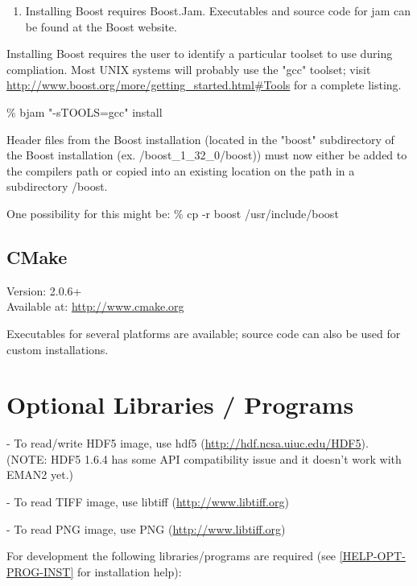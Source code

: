   \begin{enumerate}
    \item
      Installing Boost requires Boost.Jam.  Executables and
      source code for jam can be found at the Boost website.
  \end {enumerate}

  Installing Boost requires the user to identify a particular
  toolset to use during compliation.  Most UNIX systems will
  probably use the "gcc" toolset; visit
  \href{http://www.boost.org/more/getting\_started.html\#Tools}{http://www.boost.org/more/getting\_started.html\#Tools}
  for a complete listing.        

  \% bjam "-sTOOLS=gcc" install

  Header files from the Boost installation (located in the
  "boost" subdirectory of the Boost installation
  (ex. /boost\_1\_32\_0/boost)) must now either be added to the
  compilers path or copied into an existing location on the path
  in a subdirectory /boost.

  One possibility for this might be:
  \% cp -r boost /usr/include/boost
      
  
\subsection{CMake}
  Version: 2.0.6+\\
  Available at: \href{http://www.cmake.org}{http://www.cmake.org}
    

       Executables for several platforms are available; source code
       can also be used for custom installations.


\section{Optional Libraries / Programs} 
\label{OPTIONAL-LIBRARIES} 

  - To read/write HDF5 image, use hdf5 (\href{http://hdf.ncsa.uiuc.edu/HDF5}{http://hdf.ncsa.uiuc.edu/HDF5}).
	  (NOTE: HDF5 1.6.4 has some API compatibility issue and it doesn't work	        with EMAN2 yet.)
	  
    - To read TIFF image, use libtiff (\href{http://www.libtiff.org}{http://www.libtiff.org})

    - To read PNG image, use PNG (\href{http://www.libpng.org}{http://www.libtiff.org})

    For development the following libraries/programs are required (see
    \ref{HELP-OPT-PROG-INST} for installation help):

